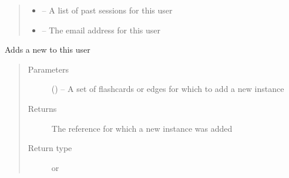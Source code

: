 \documentclass[letterpaper,10pt,english]{sphinxmanual}
\begin{document}
\begin{fulllineitems}
\begin{quote}
\begin{description}
\begin{itemize}
\item {} 
 -- A list of past sessions for this user

\item {} 
\href{https://docs.python.org/2/library/email.html\#module-email}{} -- The email address for this user

\end{itemize}

\end{description}\end{quote}

\begin{fulllineitems}
\label{\detokenize{user:user.User.add_new_instance}}
Adds a new  to this user
\begin{quote}\begin{description}
\item[{Parameters}] \leavevmode
{} (\href{https://docs.python.org/2/library/functions.html\#list}{}\sphinxstyleliteralemphasis{)}\sphinxstyleliteralemphasis{}) -- A set of flashcards or edges for which to add a new instance

\item[{Returns}] \leavevmode
The reference for which a new instance was added

\item[{Return type}] \leavevmode
{\hyperref[\detokenize{flashcard:flashcard.Flashcard}]{}} or {\hyperref[\detokenize{edge:edge.Edge}]{}}

\end{description}\end{quote}

\end{fulllineitems}



\end{fulllineitems}
\end{document}
